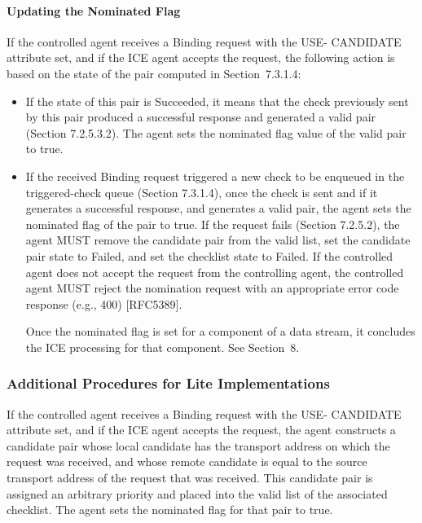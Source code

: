 \documentclass{article}
\begin{document}
\paragraph{Updating the Nominated Flag}

If the controlled agent receives a Binding request with the USE- CANDIDATE attribute set, and if the ICE agent accepts the request, the following action is based on the state of the pair computed in Section~7.3.1.4:

\begin{itemize}
\item If the state of this pair is Succeeded, it means that the check previously sent by this pair produced a successful response and generated a valid pair (Section 7.2.5.3.2).  The agent sets the nominated flag value of the valid pair to true.
\item If the received Binding request triggered a new check to be enqueued in the triggered-check queue (Section 7.3.1.4), once the check is sent and if it generates a successful response, and generates a valid pair, the agent sets the nominated flag of the pair to true.  If the request fails (Section 7.2.5.2), the agent MUST remove the candidate pair from the valid list, set the candidate pair state to Failed, and set the checklist state to Failed.
If the controlled agent does not accept the request from the controlling agent, the controlled agent MUST reject the nomination request with an appropriate error code response (e.g., 400) [RFC5389].

Once the nominated flag is set for a component of a data stream, it concludes the ICE processing for that component.  See Section~8.

\end{itemize}
\subsubsection{Additional Procedures for Lite Implementations}

If the controlled agent receives a Binding request with the USE- CANDIDATE attribute set, and if the ICE agent accepts the request, the agent constructs a candidate pair whose local candidate has the transport address on which the request was received, and whose remote candidate is equal to the source transport address of the request that was received.  This candidate pair is assigned an arbitrary priority and placed into the valid list of the associated checklist. The agent sets the nominated flag for that pair to true.
\end{document}

